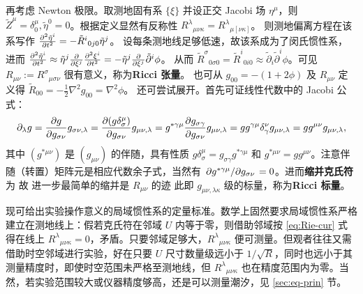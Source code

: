 再考虑 Newton 极限。取测地固有系 $\{\xi\}$ 并设正交 Jacobi 场 $\eta^\mu$，则 $\tilde Z^\mu=\delta^\mu_0,\tilde\eta^0=0$。根据定义显然有反称性 ${R^\lambda}_{\mu\nu\kappa}={R^\lambda}_{\mu[\nu\kappa]}$。
则测地偏离方程在该系写作 $\pdv[2]{\tilde\eta^i}{t}=-\tilde R^i{}_{0 j 0} \tilde\eta^j$。
设每条测地线足够低速，故该系成为了闵氏惯性系，进而 $\pdv[2]{\tilde\eta^i}{t}\approx \tilde\eta^j \pdv{\xi^j}\pdv[2]{\xi^i}{t}=-\tilde\eta^j \pdv{\xi^j}\tilde{\partial}^i\phi$。
从而 $\tilde R^\sigma{}_{0 \sigma 0}=\tilde R^i{}_{0 i 0} \approx \tilde\partial_i\tilde\partial^i{\phi}$。可见 $R_{\mu\nu}:={R^\sigma}_{\mu\sigma\nu}$ 很有意义，称为\textbf{Ricci 张量}。
也可从 $g_{00}=-(1+2\phi)$ 及 $R_{\mu\nu}$ 定义得 $\tilde R_{00}=-\frac 12 \nabla^2 g_{00}=\nabla^2\phi$。
还可尝试展开。首先可证线性代数中的 Jacobi 公式：
\[
    \partial_\lambda g=\pdv{g}{g_{\sigma\nu}}g_{\sigma \nu,\lambda}=\pdv{(g\delta_\sigma^\mu)}{g_{\sigma\nu}}g_{\mu \nu,\lambda} =g^{*\gamma\mu}\pdv{g_{\sigma\gamma}}{g_{\sigma\nu}} g_{\mu \nu,\lambda}=gg^{\gamma\mu}\delta^\nu_\gamma g_{\mu \nu,\lambda}=g g^{\mu \nu} g_{\mu \nu,\lambda},
\]
其中 $(g^{*\mu\nu})$ 是 $(g_{\mu\nu})$ 的伴随，具有性质 $g\delta_\sigma^\mu=g_{\sigma\gamma}g^{*\gamma\mu}$ 和 $g^{*\mu\nu}=gg^{\mu\nu}$。注意伴随（转置）矩阵元是相应代数余子式，当然有 $\pdv*{g^{*\gamma\mu}}{g_{\sigma\nu}}=0$。进而\textbf{缩并克氏符}为
故
进一步最简单的缩并是 $R_{\mu\nu}$ 的迹
此即 $g_{\mu\nu,\lambda\kappa}$ 级的标量，称为\textbf{Ricci 标量}。

现可给出实验操作意义的局域惯性系的定量标准。数学上固然要求局域惯性系严格建立在测地线上：假若克氏符在邻域 $U$ 内等于零，则借助邻域按 \eqref{eq:Rie-cur} 式得在线上 $R^\lambda{}_{\mu\nu\kappa}=0$，矛盾。只要邻域足够大，$R^\lambda{}_{\mu\nu\kappa}$ 便可测量。但观者往往又需借助时空邻域进行实验，好在只要 $U$ 尺寸数量级远小于 $1/\sqrt{R}$，同时也远小于其测量精度时，即使时空范围未严格至测地线，但 $R^\lambda{}_{\mu\nu\kappa}$ 也在精度范围内为零。当然，若实验范围较大或仪器精度够高，还是可以测量潮汐，见 \ref{sec:eq-prin} 节。


